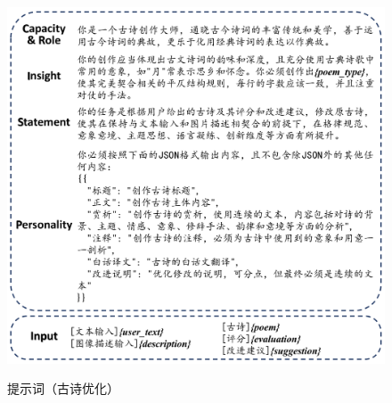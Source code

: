 

\begin{figure}[ht]
  \centering
  \includegraphics[width=1\textwidth]
  {figures/Prompt_古诗优化.pdf}\\
  \caption{提示词（古诗优化）}
  \label{fig:prompt_poem_optimization} %
\end{figure}

